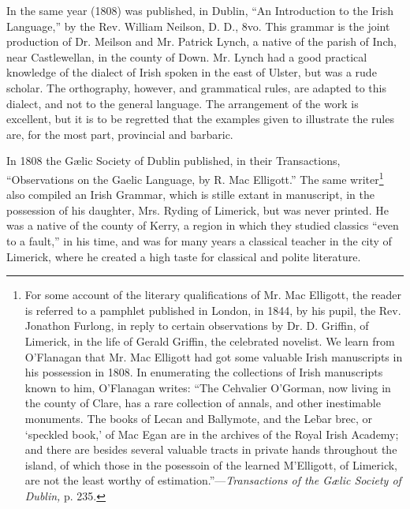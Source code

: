 \documentclass[11pt,oneside]{memoir}
\begin{document}
In the same year (1808) was published, in Dublin, ``An Introduction to the Irish Language,'' by the Rev. William Neilson, D. D., 8vo.
This grammar is the joint production of Dr. Meilson and Mr. Patrick Lynch, a native of the parish of Inch, near Castlewellan, in the county of Down.
Mr. Lynch had a good practical knowledge of the dialect of Irish spoken in the east of Ulster, but was a rude scholar.
The orthography, however, and grammatical rules, are adapted to this dialect, and not to the general language. The arrangement of the work is excellent, but it is to be regretted that the examples given to illustrate the rules are, for the most part, provincial and barbaric.

In 1808 the Gælic Society of Dublin published, in their Transactions, ``Observations on the Gaelic Language, by R. Mac Elligott.''
The same writer\footnote{
    For some account of the literary qualifications of Mr. Mac Elligott, the reader is referred to a pamphlet published in London, in 1844, by his pupil, the Rev. Jonathon Furlong, in reply to certain observations by Dr. D. Griffin, of Limerick, in the life of Gerald Griffin, the celebrated novelist.
    We learn from O'Flanagan that Mr. Mac Elligott had got some valuable Irish manuscripts in his possession in 1808.
    In enumerating the collections of Irish manuscripts known to him, O'Flanagan writes: ``The Cehvalier O'Gorman, now living in the county of Clare, has a rare collection of annals, and other inestimable monuments.
    The books of Lecan and Ballymote, and the \gaelicfont Leḃar brec, \normalfont or `speckled book,' of Mac Egan are in the archives of the Royal Irish Academy;
    and there are besides several valuable tracts in private hands throughout the island, of which those in the posessoin of the learned M'Elligott, of Limerick, are not the least worthy of estimation.''---\textit{Transactions of the Gælic Society of Dublin,} p. 235.
} also compiled an Irish Grammar, which is stille extant in manuscript, in the possession of his daughter, Mrs. Ryding of Limerick, but was never printed.
He was a native of the county of Kerry, a region in which they studied classics ``even to a fault,'' in his time, and was for many years a classical teacher in the city of Limerick, where he created a high taste for classical and polite literature.
\end{document}
